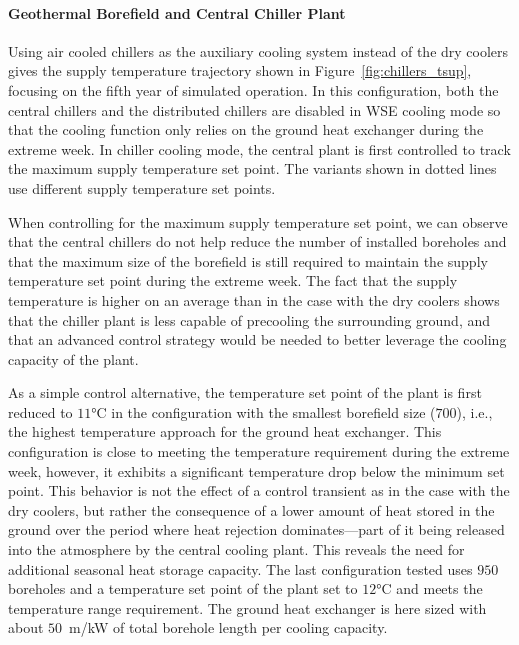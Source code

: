 \paragraph{Geothermal Borefield and Central Chiller Plant}

Using air cooled chillers as the auxiliary cooling system instead of the dry coolers gives the supply temperature trajectory shown in Figure~\ref{fig:chillers_tsup}, focusing on the fifth year of simulated operation.
In this configuration, both the central chillers and the distributed chillers are disabled in WSE cooling mode so that the cooling function only relies on the ground heat exchanger during the extreme week.
In chiller cooling mode, the central plant is first controlled to track the maximum supply temperature set point. The variants shown in dotted lines use different supply temperature set points.

When controlling for the maximum supply temperature set point, we can observe that the central chillers do not help reduce the number of installed boreholes and  that the maximum size of the borefield is still required to maintain the supply temperature set point during the extreme week. The fact that the supply temperature is higher on an average than in the case with the dry coolers shows that the chiller plant is less capable of precooling the surrounding ground, and that an advanced control strategy would be needed to better leverage the cooling capacity of the plant.

As a simple control alternative, the temperature set point of the plant is first reduced to $11$°C in the configuration with the smallest borefield size ($700$), i.e., the highest temperature approach for the ground heat exchanger. This configuration is close to meeting the temperature requirement during the extreme week, however, it exhibits a significant temperature drop below the minimum set point.
This behavior is not the effect of a control transient as in the case with the dry coolers, but rather the consequence of a lower amount of heat stored in the ground over the period where heat rejection dominates---part of it being released into the atmosphere by the central cooling plant. This reveals the need for additional seasonal heat storage capacity.
The last configuration tested uses $950$ boreholes and a temperature set point of the plant set to $12$°C and meets the temperature range requirement.
The ground heat exchanger is here sized with about $50$~m/kW of total borehole length per cooling capacity.



